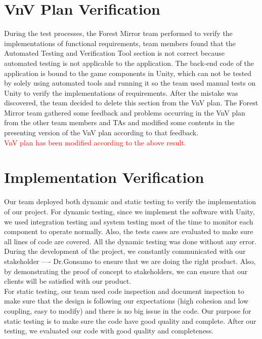 \documentclass[12pt, titlepage]{article}
\begin{document}
\section{VnV Plan Verification}
During the test processes, the Forest Mirror team performed to verify the
implementations of functional requirements, team members found that the 
Automated Testing and Verification Tool section is not correct because 
automated testing is not applicable to the application. The back-end code of
the application is bound to the game components in Unity, which can not be 
tested by solely using automated tools and running it so the team used manual
tests on Unity to verify the implementations of requirements. After the 
mistake was discovered, the team decided to delete this section from the VnV
plan.
The Forest Mirror team gathered some feedback and problems occurring in the
VnV plan from the other team members and TAs and modified some contents in the
presenting version of the VnV plan according to that feedback.\\

\noindent
\textcolor{red}{VnV plan has been modified according to the above
result.}


\section{Implementation Verification}
Our team deployed both dynamic and static testing to verify the 
implementation of our project. For dynamic testing, since we implement 
the software with Unity, we used integration testing and system testing
most of the time to monitor each component to operate normally. Also,
the tests cases are evaluated to make sure all lines of code are 
covered. All the dynamic testing was done without any error. \\
\noindent
During the development of the project, we constantly communicated with
our stakeholder ---- Dr.Gonsamo to ensure that we are doing the right
product. Also, by demonstrating the proof of concept to stakeholders,
we can ensure that our clients will be satisfied with our product.\\
\noindent
For static testing, our team used code inspection and document
inspection to make sure that the design is following our
expectations (high cohesion and low coupling, easy to modify) and there
is no big issue in the code. Our purpose for static testing is to make 
sure the code have good quality and complete. After our testing, we evaluated our code with good quality and completeness.
\end{document}
